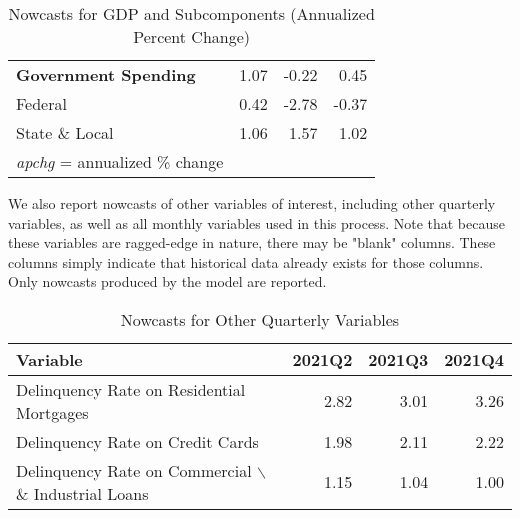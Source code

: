 \documentclass[11pt, letterpaper]{article}\usepackage[]{graphicx}\usepackage[]{color}
\begin{document}
\begin{table}[H]
\begin{tabular}{lrrr}
  \hspace{0mm} \textbf{Government Spending} & 1.07 & -0.22 & 0.45 \\ 
  \hspace{8mm}  Federal & 0.42 & -2.78 & -0.37 \\ 
  \hspace{8mm}  State \& Local & 1.06 & 1.57 & 1.02 \\ 
   \hline 
 \textit{apchg} = annualized \% change 
\end{tabular}
\endgroup
\caption{Nowcasts for GDP and Subcomponents (Annualized Percent Change)} 
\end{table}


We also report nowcasts of other variables of interest, including other quarterly variables, as well as all monthly variables used in this process. Note that because these variables are ragged-edge in nature, there may be "blank" columns. These columns simply indicate that historical data already exists for those columns. Only nowcasts produced by the model are reported.
\begin{table}[H]
\centering
\begingroup\fontsize{11pt}{13pt}\selectfont
\begin{tabular}{lrrr}
  \hline
Variable & 2021Q2 & 2021Q3 & 2021Q4 \\ 
  \hline
Delinquency Rate on Residential Mortgages & 2.82 & 3.01 & 3.26 \\ 
  Delinquency Rate on Credit Cards & 1.98 & 2.11 & 2.22 \\ 
  Delinquency Rate on Commercial $\backslash$\& Industrial Loans & 1.15 & 1.04 & 1.00 \\ 
   \hline
\end{tabular}
\endgroup
\caption{Nowcasts for Other Quarterly Variables} 
\end{table}
\end{document}
